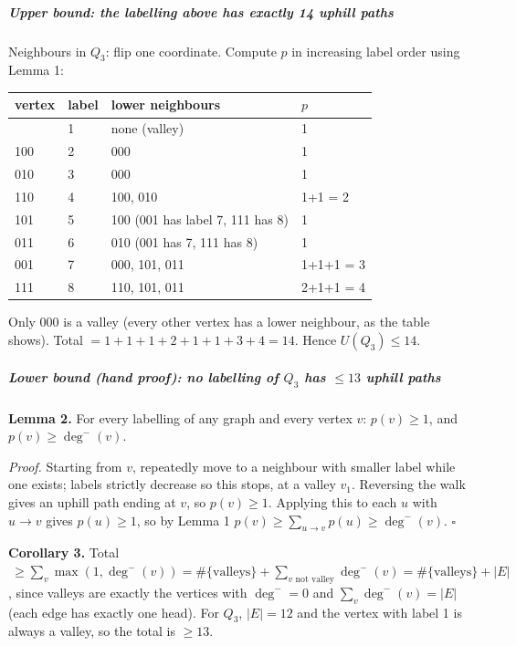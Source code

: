 \subparagraph{Upper bound: the labelling above has exactly 14 uphill
paths}\label{upper-bound-the-labelling-above-has-exactly-14-uphill-paths}

Neighbours in \(Q_3\): flip one coordinate. Compute \(p\) in increasing
label order using Lemma 1:

{\def\LTcaptype{none} %
\begin{longtable}[]{@{}llll@{}}
\toprule\noalign{}
vertex & label & lower neighbours & \(p\) \\
\midrule\noalign{}
\endhead
\bottomrule\noalign{}
\endlastfoot
000 & 1 & none (valley) & 1 \\
100 & 2 & 000 & 1 \\
010 & 3 & 000 & 1 \\
110 & 4 & 100, 010 & 1+1 = 2 \\
101 & 5 & 100 (001 has label 7, 111 has 8) & 1 \\
011 & 6 & 010 (001 has 7, 111 has 8) & 1 \\
001 & 7 & 000, 101, 011 & 1+1+1 = 3 \\
111 & 8 & 110, 101, 011 & 2+1+1 = 4 \\
\end{longtable}
}

Only 000 is a valley (every other vertex has a lower neighbour, as the
table shows). Total \(=1+1+1+2+1+1+3+4 = 14\). Hence \(U(Q_3)\le 14\).

\subparagraph{\texorpdfstring{Lower bound (hand proof): no labelling of
\(Q_3\) has \(\le 13\) uphill
paths}{Lower bound (hand proof): no labelling of Q\_3 has \textbackslash le 13 uphill paths}}\label{lower-bound-hand-proof-no-labelling-of-q_3-has-le-13-uphill-paths}

\textbf{Lemma 2.} For every labelling of any graph and every vertex
\(v\): \(p(v)\ge 1\), and \(p(v)\ge \deg^-(v)\).

\emph{Proof.} Starting from \(v\), repeatedly move to a neighbour with
smaller label while one exists; labels strictly decrease so this stops,
at a valley \(v_1\). Reversing the walk gives an uphill path ending at
\(v\), so \(p(v)\ge1\). Applying this to each \(u\) with \(u\to v\)
gives \(p(u)\ge1\), so by Lemma 1
\(p(v)\ge\sum_{u\to v}p(u)\ge\deg^-(v)\). \(\square\)

\textbf{Corollary 3.} Total
\(\ \ge \sum_v \max(1,\deg^-(v)) = \#\{\text{valleys}\} + \sum_{v \text{ not valley}}\deg^-(v) = \#\{\text{valleys}\} + |E|\),
since valleys are exactly the vertices with \(\deg^-=0\) and
\(\sum_v\deg^-(v)=|E|\) (each edge has exactly one head). For \(Q_3\),
\(|E|=12\) and the vertex with label 1 is always a valley, so the total
is \(\ge 13\).

